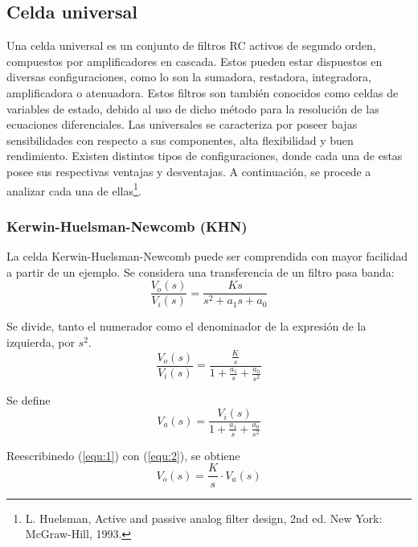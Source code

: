 



\subsection{Celda universal}
Una celda universal es un conjunto de filtros RC activos de segundo orden, compuestos por amplificadores en cascada. Estos pueden estar dispuestos en diversas configuraciones, como lo son la sumadora, restadora, integradora, amplificadora o atenuadora. Estos filtros son también conocidos como celdas de variables de estado, debido al uso de dicho método para la resolución de las ecuaciones diferenciales. Las universales se caracteriza por poseer bajas sensibilidades con respecto a sus componentes, alta flexibilidad y buen rendimiento. Existen distintos tipos de configuraciones, donde cada una de estas posee sus respectivas ventajas y desventajas. A continuación, se procede a analizar cada una de ellas\footnote{L. Huelsman, Active and passive analog filter design, 2nd ed. New York: McGraw-Hill, 1993.}.

\subsubsection{Kerwin-Huelsman-Newcomb (KHN)}
La celda Kerwin-Huelsman-Newcomb %
puede ser comprendida con mayor facilidad a partir de un ejemplo. Se considera una transferencia de un filtro pasa banda:
\begin{equation}
	\frac{V_o(s)}{V_i(s)} = \frac{Ks}{s^2 + a_1 s + a_0}
\end{equation}

Se divide, tanto el numerador como el denominador de la expresión de la izquierda, por $s^2$.
\begin{equation}
	\frac{V_o(s)}{V_i(s)} = \frac{\frac{K}{s}}{1 + \frac{a_1}{s} + \frac{a_0}{s^2}}
	\label{equ:1}
\end{equation}

Se define
\begin{equation}
	V_a(s) = \frac{V_i(s)}{1 + \frac{a_1}{s} + \frac{a_0}{s^2}}
	\label{equ:2}
\end{equation}

Reescribinedo (\ref{equ:1}) con (\ref{equ:2}), se obtiene
\begin{equation}
	V_o(s) = \frac{K}{s} \cdot V_a(s)
	\label{equ:3}
\end{equation}

